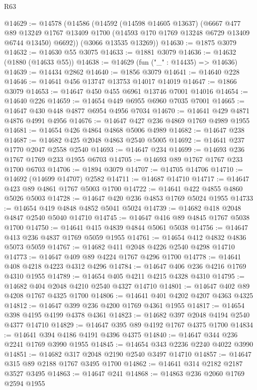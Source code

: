 \begin{lexlean}{R63}
\begin{coremodule}
@14629 := @14578
    (@14586
      (@14592
        (@14598 @14605 @13637)
        (@6667
          @477
          @89
          @13249
          @1767
          @13409
          @1700
          (@14593 @170 @1769 @13248 @6729 @13409 @6744 @13450)
          @6692))
      (@3066 @13535 @13269))
@14630 := @1875 @3079
@14632 := @14630 @55 @3075
@14633 := @1881 @3079
@14636 := @14632 (@1880 (@14633 @55))
@14638 := @14629 (fun ("_" : @14435) => @14636)
@14639 := @14434 @2862
@14640 := @1856 @3079
@14641 := @14640 @228
@14646 := @14641 @456 @13747 @13753 @14017 @14019
@14647 := @1866 @3079
@14653 := @14647 @450 @455 @6961 @13746 @7001 @14016
@14654 := @14640 @226
@14659 := @14654 @449 @6955 @6960 @7035 @7001
@14665 := @14647 @430 @448 @4877 @6954 @4956 @7034
@14670 := @14641 @429 @4871 @4876 @4991 @4956
@14676 := @14647 @427 @236 @4869 @1769 @4989 @1955
@14681 := @14654 @426 @4864 @4868 @5006 @4989
@14682 := @14647 @238
@14687 := @14682 @425 @2048 @4863 @2540 @5005
@14692 := @14641 @237 @1770 @2047 @2558 @2540
@14693 := @14647 @234
@14699 := @14693 @236 @1767 @1769 @233 @1955 @6703
@14705 := @14693 @89 @1767 @1767 @233 @1700 @6703
@14706 := @1894 @3079
@14707 := @14705 @14706
@14710 := @14692 (@14699 @14707) @2582
@14711 := @14687 @14710
@14717 := @14647 @423 @89 @4861 @1767 @5003 @1700
@14722 := @14641 @422 @4855 @4860 @5026 @5003
@14728 := @14647 @420 @236 @4853 @1769 @5024 @1955
@14733 := @14654 @419 @4848 @4852 @5041 @5024
@14739 := @14682 @418 @2048 @4847 @2540 @5040 @14710
@14745 := @14647 @416 @89 @4845 @1767 @5038 @1700
@14750 := @14641 @415 @4839 @4844 @5061 @5038
@14756 := @14647 @413 @236 @4837 @1769 @5059 @1955
@14761 := @14654 @412 @4832 @4836 @5073 @5059
@14767 := @14682 @411 @2048 @4226 @2540 @4298 @14710
@14773 := @14647 @409 @89 @4224 @1767 @4296 @1700
@14778 := @14641 @408 @4218 @4223 @4312 @4296
@14784 := @14647 @406 @236 @4216 @1769 @4310 @1955
@14789 := @14654 @405 @4211 @4215 @4328 @4310
@14795 := @14682 @404 @2048 @4210 @2540 @4327 @14710
@14801 := @14647 @402 @89 @4208 @1767 @4325 @1700
@14806 := @14641 @401 @4202 @4207 @4363 @4325
@14812 := @14647 @399 @236 @4200 @1769 @4361 @1955
@14817 := @14654 @398 @4195 @4199 @4378 @4361
@14823 := @14682 @397 @2048 @4194 @2540 @4377 @14710
@14829 := @14647 @395 @89 @4192 @1767 @4375 @1700
@14834 := @14641 @394 @4186 @4191 @4396 @4375
@14840 := @14647 @344 @236 @2241 @1769 @3990 @1955
@14845 := @14654 @343 @2236 @2240 @4022 @3990
@14851 := @14682 @317 @2048 @2190 @2540 @3497 @14710
@14857 := @14647 @315 @89 @2188 @1767 @3495 @1700
@14862 := @14641 @314 @2182 @2187 @3527 @3495
@14863 := @14647 @241
@14868 := @14863 @236 @2060 @1769 @2594 @1955

\end{coremodule}
\end{lexlean}
